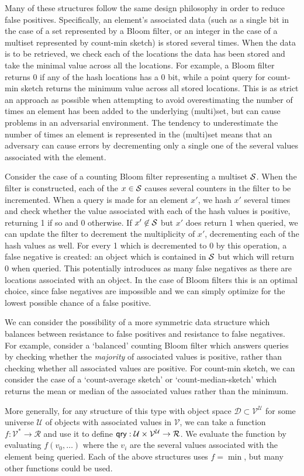 Many of these structures follow the same design philosophy in order to reduce false positives. Specifically, an element's associated data (such as a single bit in the case of a set represented by a Bloom filter, or an integer in the case of a multiset represented by count-min sketch) is stored several times. When the data is to be retrieved, we check each of the locations the data has been stored and take the minimal value across all the locations. For example, a Bloom filter returns 0 if any of the hash locations has a 0 bit, while a point query for count-min sketch returns the minimum value across all stored locations. This is as strict an approach as possible when attempting to avoid overestimating the number of times an element has been added to the underlying (multi)set, but can cause problems in an adversarial environment. The tendency to underestimate the number of times an element is represented in the (multi)set means that an adversary can cause errors by decrementing only a single one of the several values associated with the element.

Consider the case of a counting Bloom filter representing a multiset $\mathcal{S}$. When the filter is constructed, each of the $x \in \mathcal{S}$ causes several counters in the filter to be incremented. When a query is made for an element $x'$, we hash $x'$ several times and check whether the value associated with each of the hash values is positive, returning 1 if so and 0 otherwise. If $x' \not\in \mathcal{S}$ but $x'$ does return 1 when queried, we can update the filter to decrement the multiplicity of $x'$, decrementing each of the hash values as well. For every 1 which is decremented to 0 by this operation, a false negative is created: an object which is contained in $\mathcal{S}$ but which will return 0 when queried. This potentially introduces as many false negatives as there are locations associated with an object. In the case of Bloom filters this is an optimal choice, since false negatives are impossible and we can simply optimize for the lowest possible chance of a false positive.

We can consider the possibility of a more symmetric data structure which balances between resistance to false positives and resistance to false negatives. For example, consider a `balanced' counting Bloom filter which answers queries by checking whether the \emph{majority} of associated values is positive, rather than checking whether all associated values are positive. For count-min sketch, we can consider the case of a `count-average sketch' or `count-median-sketch' which returns the mean or median of the associated values rather than the minimum.

More generally, for any structure of this type with object space $\mathcal{D} \subset \mathcal{V}^\mathcal{U}$ for some universe $\mathcal{U}$ of objects with associated values in $\mathcal{V}$, we can take a function $f: \mathcal{V}^* \to \mathcal{R}$ and use it to define $\mathsf{qry}: \mathcal{U} \times \mathcal{V}^\mathcal{U} \to \mathcal{R}$. We evaluate the function by evaluating $f(v_0,\ldots)$ where the $v_i$ are the several values associated with the element being queried. Each of the above structures uses $f = \min$, but many other functions could be used.